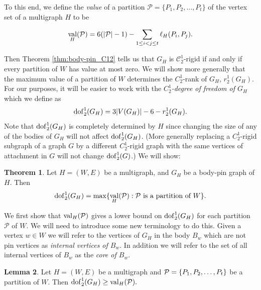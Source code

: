 \documentclass[11pt,a4paper]{article}
\theoremstyle{definition}
\newtheorem{theorem}{Theorem}[section]
\newtheorem{lemma}[theorem]{Lemma}
\DeclareMathOperator{\val}{val}
\newcommand{\dof}{{\rm dof}}
\newcommand{\cC}{\mathcal{C}}
\newcommand{\cP}{\mathcal{P}}
\begin{document}
To this end, we define the {\em value} of a partition $\cP=\{P_1,P_2,\dots,P_t\}$ of the vertex set of a multigraph $H$ to be

$$\val_H({\cal P})=6(|{\cal P}|-1) -\sum_{1\leq i<j\leq t} \ell_H(P_i,P_j).$$

Then Theorem \ref{thm:body-pin_C12} tells us that $G_H$ is $\cC_2^1$-rigid if and only if every partition of $W$ has value at most zero. We will show more generally that the maximum value of a partition of $W$ determines the $C_2^1$-rank of $G_H$, $r_2^1(G_H)$. For our purposes, it will be easier to work with the {\em $C_2^1$-degree of freedom of $G_H$} which we define as
$$\dof_2^1(G_H)=3|V(G_H)|-6-r_2^1(G_H).$$
Note that $\dof_2^1(G_H)$ is completely determined by $H$ since changing the size of any of the bodies of $G_H$ will not affect $\dof_2^1(G_H)$. (More generally replacing a $C_2^1$-rigid subgraph of a graph $G$ by a different $C_2^1$-rigid graph with the same vertices of attachment in $G$ will not change $\dof_2^1(G)$.) We will show:

\begin{theorem}\label{thm:BP} Let $H=(W,E)$ be a multigraph, and $G_H$ be a body-pin graph of $H$.  Then $$\dof_2^1(G_H)=\max \{\val_H(\cP):\mbox{$\cP$ is a partition  of $W$}\}.$$
\end{theorem}


We first show that $\val_H({\cal P})$ gives a lower bound on $\dof_2^1(G_H)$ for each partition $\cP$ of $W$. We will need to introduce some new terminology to do this. Given a vertex $w\in W$ we will refer to the vertices of $G_H$ in the body $B_w$ which are not pin vertices as {\em internal vertices of $B_w$}. In addition we will refer to the set of all internal vertices of $B_w$ as the {\em core of $B_w$}. 

\begin{lemma}\label{lem:lb} Let $H=(W,E)$ be a multigraph and ${\cal P}=\{P_1,P_2,\dots,P_t\}$ 
be a partition of $W$. Then $\dof_2^1(G_H) \geq \val_H({\cal P}).$
\end{lemma}
\end{document}

